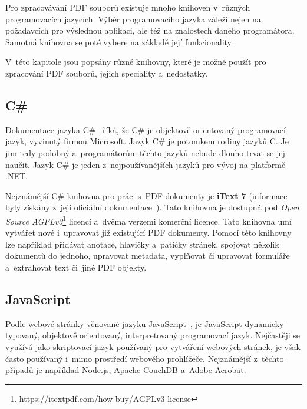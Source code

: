 Pro zpracovávání PDF souborů existuje mnoho knihoven v~různých programovacích
jazycích. Výběr programovacího jazyka záleží nejen na požadavcích pro výslednou
aplikaci, ale též na znalostech daného programátora. Samotná knihovna se poté
vybere na základě její funkcionality. 

V~této kapitole jsou popsány různé knihovny, které je možné použít pro zpracování
PDF souborů, jejich speciality a~nedostatky.


\subsection*{C\#}

Dokumentace jazyka C\#~\cite{CSharp} říká, že  C\# je objektově orientovaný 
programovací jazyk, vyvinutý firmou Microsoft.
Jazyk C\# je potomkem rodiny jazyků C. Je jim tedy podobný a~programátorům těchto
jazyků nebude dlouho trvat se jej naučit. Jazyk C\# je jeden z~nejpoužívanějších
jazyků pro vývoj na platformě .NET.

Nejznámější C\# knihovna pro práci s~PDF dokumenty je \textbf{iText 7}
(informace byly získány z~její oficiální dokumentace~\cite{iText_7}). 
Tato knihovna je dostupná pod \emph{Open Source AGPLv3}\footnote{
\href{https://itextpdf.com/how-buy/AGPLv3-license}{https://itextpdf.com/how-buy/AGPLv3-license}
} licencí a~dvěma verzemi komerční licence. Tato knihovna umí vytvářet nové
i~upravovat již existující PDF dokumenty. Pomocí této knihovny lze například
přidávat anotace, hlavičky a~patičky stránek, spojovat několik dokumentů do
jednoho, upravovat metadata, vyplňovat či upravovat formuláře a~extrahovat 
text či~jiné PDF objekty.


\subsection*{JavaScript}
Podle webové stránky věnované jazyku JavaScript~\cite{JavaScript}, je
JavaScript dynamicky typovaný, objektově orientovaný, interpretovaný
programovací jazyk. Nejčastěji se využívá jako skriptovací jazyk používaný
pro vytváření webových stránek, je však často používaný i~mimo prostředí webového
prohlížeče. Nejznámější z~těchto případů je například Node.js, Apache CouchDB
a~Adobe Acrobat. 


